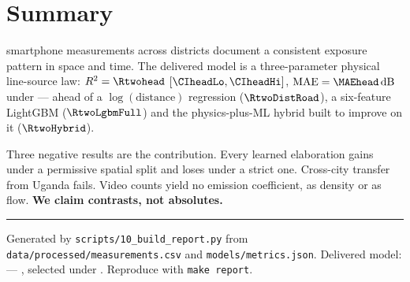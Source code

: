 \documentclass[11pt,a4paper]{article}
\newcommand{\dB}{\ensuremath{\,\mathrm{dB}}}
\begin{document}
\section{Summary}

\nMeas{} smartphone measurements across \nSites{} districts document a consistent
exposure pattern in space and time. The delivered model is a three-parameter
physical line-source law: $R^2 = \Rtwohead$ $[\CIheadLo, \CIheadHi]$,
$\mathrm{MAE} = \MAEhead\dB$ under  --- ahead of a $\log(\text{distance})$
regression ($\RtwoDistRoad$), a six-feature LightGBM ($\RtwoLgbmFull$) and the
physics-plus-ML hybrid built to improve on it ($\RtwoHybrid$).

\medskip\noindent
Three negative results are the contribution. Every learned elaboration gains
under a permissive spatial split and loses under a strict one. Cross-city
transfer from Uganda fails. Video counts yield no emission coefficient, as
density or as flow. \textbf{We claim contrasts, not absolutes.}

\vfill
\noindent\rule{\linewidth}{.4pt}\par
{\footnotesize\color{gray}
Generated by \texttt{scripts/10\_build\_report.py} from
\texttt{data/processed/measurements.csv} and \texttt{models/metrics.json}.
Delivered model: \texttt{\deliveredKey} --- \deliveredName{}, selected under
. Reproduce with \texttt{make report}.\par}
\end{document}
